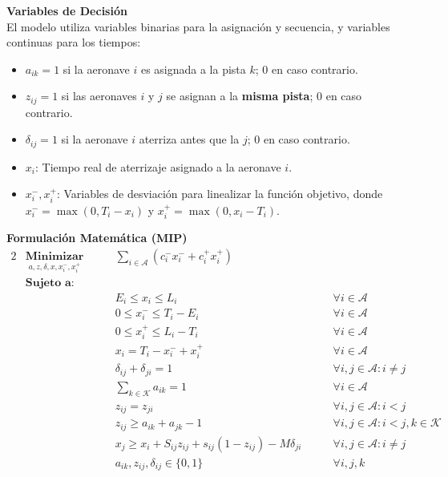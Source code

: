 \documentclass[letter, 10pt]{article}
\begin{document}
\noindent \textbf{Variables de Decisi\'on}\\
El modelo utiliza variables binarias para la asignaci\'on y secuencia, y variables continuas para los tiempos:

\begin{itemize}
    \item $a_{ik} = 1$ si la aeronave $i$ es asignada a la pista $k$; $0$ en caso contrario.
    \item $z_{ij} = 1$ si las aeronaves $i$ y $j$ se asignan a la \textbf{misma pista}; $0$ en caso contrario.
    \item $\delta_{ij} = 1$ si la aeronave $i$ aterriza antes que la $j$; $0$ en caso contrario.
    \item $x_i$: Tiempo real de aterrizaje asignado a la aeronave $i$.
    \item $x_i^-, x_i^+$: Variables de desviaci\'on para linealizar la funci\'on objetivo, donde $x_i^- = \max(0, T_i - x_i)$ y $x_i^+ = \max(0, x_i - T_i)$.
\end{itemize}

\noindent \textbf{Formulaci\'on Matem\'atica (MIP)}
\begin{alignat}{2}
& \underset{a,z,\delta,x,x_i^-,x_i^+}{\textbf{Minimizar}} \qquad & \sum_{i \in \mathcal{A}} (c_i^- x_i^- + c_i^+ x_i^+) & \label{eq:beasley_obj} \\
& \textbf{Sujeto a:} & \nonumber \\
& & E_i \leq x_i \leq L_i & \qquad \forall i \in \mathcal{A} \\
& & 0 \leq x_i^- \leq T_i - E_i & \qquad \forall i \in \mathcal{A} \\
& & 0 \leq x_i^+ \leq L_i - T_i & \qquad \forall i \in \mathcal{A} \\
& & x_i = T_i - x_i^- + x_i^+ & \qquad \forall i \in \mathcal{A} \\
& & \delta_{ij} + \delta_{ji} = 1 & \qquad \forall i, j \in \mathcal{A} : i \neq j \\
& & \sum_{k \in \mathcal{K}} a_{ik} = 1 & \qquad \forall i \in \mathcal{A} \\
& & z_{ij} = z_{ji} & \qquad \forall i, j \in \mathcal{A} : i < j \\
& & z_{ij} \geq a_{ik} + a_{jk} - 1 & \qquad \forall i, j \in \mathcal{A} : i < j, k \in \mathcal{K} \\
& & x_j \geq x_i + S_{ij}z_{ij} + s_{ij}(1 - z_{ij}) - M\delta_{ji} & \qquad \forall i, j \in \mathcal{A} : i \neq j \label{eq:beasley_sep} \\
& & a_{ik}, z_{ij}, \delta_{ij} \in \{0, 1\} & \qquad \forall i, j, k
\end{alignat}
\end{document}
